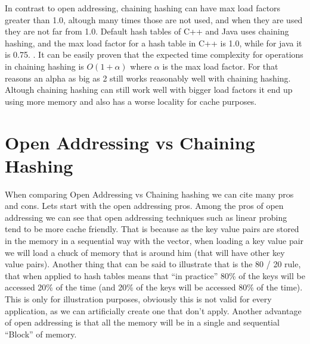 In contrast to open addressing, chaining hashing can have max load factors greater than 1.0, altough many times those are not used, and when they are used they are not far from 1.0. Default hash tables of C++ and Java uses chaining hashing, and the max load factor for a hash table in C++ is 1.0, while for java it is 0.75. \citep{MaxLoadFactorCplusplus}.
It can be easily proven that the expected time complexity for operations in chaining hashing is \( O(1 + \alpha) \) where \( \alpha \) is the max load factor. For that reasons an alpha as big as 2 still works reasonably well with chaining hashing.
Altough chaining hashing can still work well with bigger load factors it end up using more memory and also has a worse locality for cache purposes.

\section{Open Addressing vs Chaining Hashing}

When comparing Open Addressing vs Chaining hashing we can cite many pros and cons. Lets start with the open addressing pros. Among the pros of open addressing we can see that open addressing techniques such as linear probing tend to be more cache friendly. That is because as the key value pairs are stored in the memory in a sequential way with the vector, when loading a key value pair we will load a chuck of memory that is around him (that will have other key value pairs). Another thing that can be said to illustrate that is the 80 / 20 rule, that when applied to hash tables means that ``in practice'' 80\% of the keys will be accessed 20\% of the time (and 20\% of the keys will be accessed 80\% of the time). This is only for illustration purposes, obviously this is not valid for every application, as we can artificially create one that don't apply. Another advantage of open addressing is that all the memory will be in a single and sequential ``Block'' of memory. 